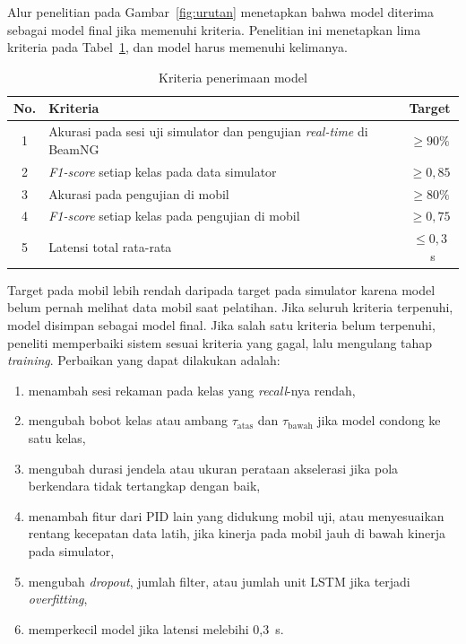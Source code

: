 Alur penelitian pada Gambar~\ref{fig:urutan} menetapkan bahwa model diterima sebagai model final jika memenuhi kriteria. Penelitian ini menetapkan lima kriteria pada Tabel~\ref{tab:kriteria}, dan model harus memenuhi kelimanya.

\begin{table}[H]
  \centering
  \caption{Kriteria penerimaan model}
  \label{tab:kriteria}
  \begin{tabular}{|c|p{8.5cm}|c|}
    \hline
    \textbf{No.} & \textbf{Kriteria} & \textbf{Target} \\
    \hline
    1 & Akurasi pada sesi uji simulator dan pengujian \textit{real-time} di BeamNG & $\ge 90\%$ \\
    \hline
    2 & \textit{F1-score} setiap kelas pada data simulator & $\ge 0{,}85$ \\
    \hline
    3 & Akurasi pada pengujian di mobil & $\ge 80\%$ \\
    \hline
    4 & \textit{F1-score} setiap kelas pada pengujian di mobil & $\ge 0{,}75$ \\
    \hline
    5 & Latensi total rata-rata & $\le 0{,}3$~s \\
    \hline
  \end{tabular}
\end{table}

Target pada mobil lebih rendah daripada target pada simulator karena model belum pernah melihat data mobil saat pelatihan. Jika seluruh kriteria terpenuhi, model disimpan sebagai model final. Jika salah satu kriteria belum terpenuhi, peneliti memperbaiki sistem sesuai kriteria yang gagal, lalu mengulang tahap \textit{training}. Perbaikan yang dapat dilakukan adalah:
\begin{enumerate}
  \item menambah sesi rekaman pada kelas yang \textit{recall}-nya rendah,
  \item mengubah bobot kelas atau ambang $\tau_{\mathrm{atas}}$ dan $\tau_{\mathrm{bawah}}$ jika model condong ke satu kelas,
  \item mengubah durasi jendela atau ukuran perataan akselerasi jika pola berkendara tidak tertangkap dengan baik,
  \item menambah fitur dari PID lain yang didukung mobil uji, atau menyesuaikan rentang kecepatan data latih, jika kinerja pada mobil jauh di bawah kinerja pada simulator,
  \item mengubah \textit{dropout}, jumlah filter, atau jumlah unit LSTM jika terjadi \textit{overfitting},
  \item memperkecil model jika latensi melebihi 0,3~s.
\end{enumerate}
